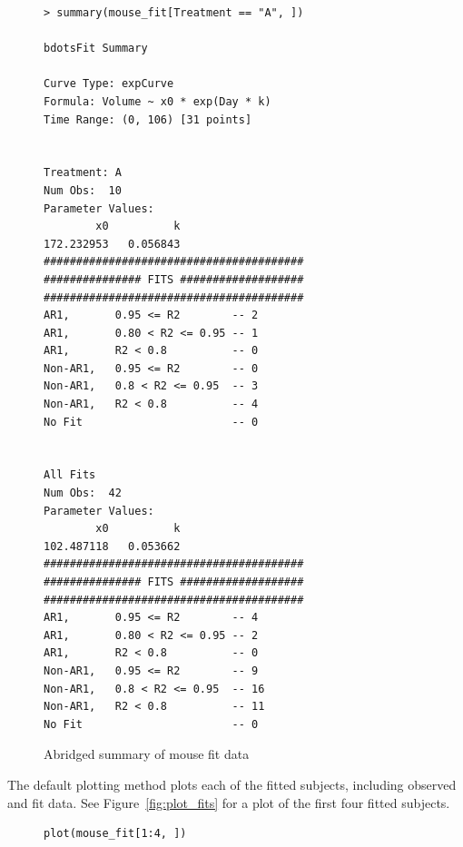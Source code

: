 \documentclass{article}
\begin{document}
\begin{singlespace}
\begin{figure}[H]
\centering
\begin{BVerbatim}
> summary(mouse_fit[Treatment == "A", ])

bdotsFit Summary

Curve Type: expCurve 
Formula: Volume ~ x0 * exp(Day * k) 
Time Range: (0, 106) [31 points]


Treatment: A 
Num Obs:  10 
Parameter Values: 
        x0          k 
172.232953   0.056843 
########################################
############### FITS ###################
########################################
AR1,       0.95 <= R2        -- 2 
AR1,       0.80 < R2 <= 0.95 -- 1 
AR1,       R2 < 0.8          -- 0 
Non-AR1,   0.95 <= R2        -- 0 
Non-AR1,   0.8 < R2 <= 0.95  -- 3 
Non-AR1,   R2 < 0.8          -- 4 
No Fit                       -- 0 


All Fits 
Num Obs:  42 
Parameter Values: 
        x0          k 
102.487118   0.053662 
########################################
############### FITS ###################
########################################
AR1,       0.95 <= R2        -- 4 
AR1,       0.80 < R2 <= 0.95 -- 2 
AR1,       R2 < 0.8          -- 0 
Non-AR1,   0.95 <= R2        -- 9 
Non-AR1,   0.8 < R2 <= 0.95  -- 16 
Non-AR1,   R2 < 0.8          -- 11 
No Fit                       -- 0 
\end{BVerbatim}
\caption{Abridged summary of mouse fit data}
\end{figure}
\end{singlespace}

The default plotting method plots each of the fitted subjects, including observed and fit data. See Figure~\ref{fig:plot_fits} for a plot of the first four fitted subjects.

\begin{singlespace}
\begin{figure}[H]
\centering
\begin{BVerbatim}
plot(mouse_fit[1:4, ])
\end{BVerbatim}
\end{figure}
\end{singlespace}
\end{document}
